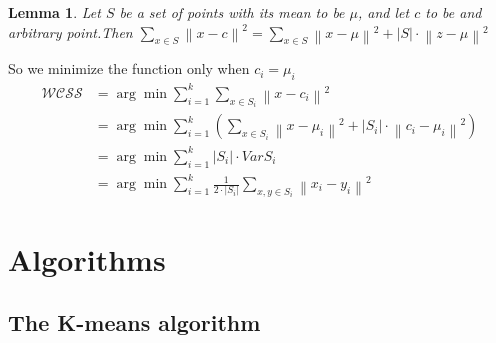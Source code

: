 \documentclass[11pt]{article}
\newtheorem{lemma}[theorem]{Lemma}
\begin{document}
\begin{lemma}
  Let $S$ be a set of points with its mean to be $\mu$, and let $c$ to be and arbitrary point.Then $\sum_{x \in S}{\left\lVert x - c\right\rVert}^2 = \sum_{x \in S}{\left\lVert x - \mu\right\rVert}^2 + \left\lvert S \right\rvert \cdot {\left\lVert z - \mu\right\rVert}^2 $
\end{lemma}
\par So we minimize the function only when $c_i=\mu_i$
\begin{equation*}
  \begin{split}
    \mathcal{WCSS} & = \arg \min \sum_{i=1}^{k} \sum_{x \in S_i } {\left\lVert x - c _i \right\rVert }^2 \\
    & = \arg \min \sum_{i=1}^{k} (\sum_{x \in S_i} {\left\lVert x - \mu_i\right\rVert}^2 + \left\lvert S_i \right\rvert \cdot {\left\lVert c_i - \mu_i\right\rVert}^2) \\
    & = \arg \min \sum_{i=1}^{k} {\left\lvert S_i \right\rvert }\cdot Var S_i \\
    & = \arg \min \sum_{i=1}^{k} \frac{1}{2\cdot\left\lvert S_i\right\rvert } \sum_{x,y \in S_i} {\left\lVert x_i - y_i\right\rVert }^2
  \end{split}
\end{equation*}


\section{Algorithms}
\subsection{The K-means algorithm}
\end{document}
